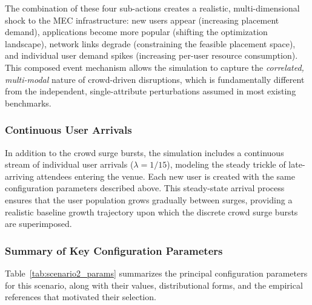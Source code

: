 The combination of these four sub-actions creates a realistic, multi-dimensional shock to the MEC infrastructure: new users appear (increasing placement demand), applications become more popular (shifting the optimization landscape), network links degrade (constraining the feasible placement space), and individual user demand spikes (increasing per-user resource consumption). This composed event mechanism allows the simulation to capture the \emph{correlated, multi-modal} nature of crowd-driven disruptions, which is fundamentally different from the independent, single-attribute perturbations assumed in most existing benchmarks.

\subsubsection{Continuous User Arrivals}

In addition to the crowd surge bursts, the simulation includes a continuous stream of individual user arrivals ($\lambda = 1/15$), modeling the steady trickle of late-arriving attendees entering the venue. Each new user is created with the same configuration parameters described above. This steady-state arrival process ensures that the user population grows gradually between surges, providing a realistic baseline growth trajectory upon which the discrete crowd surge bursts are superimposed.

\subsubsection{Summary of Key Configuration Parameters}

Table~\ref{tab:scenario2_params} summarizes the principal configuration parameters for this scenario, along with their values, distributional forms, and the empirical references that motivated their selection.

